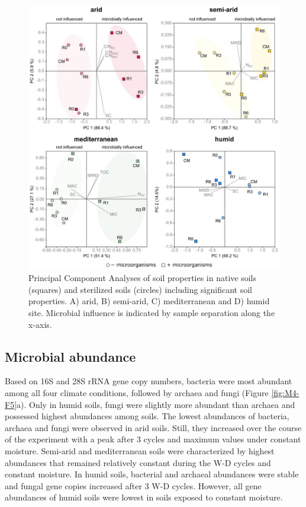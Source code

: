 \begin{figure}[H]
	\centering
	\includegraphics[width=1\textwidth]{img/M4-Figure_4.jpg}
	\caption{Principal Component Analyses of soil properties in native soils (squares) and sterilized soils (circles) including significant soil properties. A) arid, B) semi-arid, C) mediterranean and D) humid site. Microbial influence is indicated by sample separation along the x-axis.}
	\label{fig:M4-F4}
\end{figure}

\subsection{Microbial abundance}

Based on 16S and 28S rRNA gene copy numbers, bacteria were most abundant among all four climate conditions, followed by archaea and fungi (Figure \ref{fig:M4-F5}a). Only in humid soils, fungi were slightly more abundant than archaea and possessed highest abundances among soils. The lowest abundances of bacteria, archaea and fungi were observed in arid soils. Still, they increased over the course of the experiment with a peak after 3 cycles and maximum values under constant moisture. Semi-arid and mediterranean soils were characterized by highest abundances that remained relatively constant during the W-D cycles and constant moisture. In humid soils, bacterial and archaeal abundances were stable and fungal gene copies increased after 3 W-D cycles. However, all gene abundances of humid soils were lowest in soils exposed to constant moisture.

